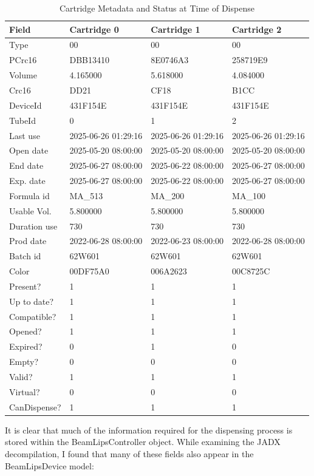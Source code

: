 \begin{table}[H]
\centering
\caption{Cartridge Metadata and Status at Time of Dispense}
\label{tab:cartridgedata}
\begin{scriptsize}
\begin{tabular}{|l|l|l|l|}
\hline
\textbf{Field} & \textbf{Cartridge 0} & \textbf{Cartridge 1} & \textbf{Cartridge 2} \\
\hline
Type & 00 & 00 & 00 \\
PCrc16 & DBB13410 & 8E0746A3 & 258719E9 \\
Volume & 4.165000 & 5.618000 & 4.084000 \\
Crc16 & DD21 & CF18 & B1CC \\
DeviceId & 431F154E & 431F154E & 431F154E \\
TubeId & 0 & 1 & 2 \\
Last use & 2025-06-26 01:29:16 & 2025-06-26 01:29:16 & 2025-06-26 01:29:16 \\
Open date & 2025-05-20 08:00:00 & 2025-05-20 08:00:00 & 2025-05-20 08:00:00 \\
End date & 2025-06-27 08:00:00 & 2025-06-22 08:00:00 & 2025-06-27 08:00:00 \\
Exp. date & 2025-06-27 08:00:00 & 2025-06-22 08:00:00 & 2025-06-27 08:00:00 \\
Formula id & MA\_513 & MA\_200 & MA\_100 \\
Usable Vol. & 5.800000 & 5.800000 & 5.800000 \\
Duration use & 730 & 730 & 730 \\
Prod date & 2022-06-28 08:00:00 & 2022-06-23 08:00:00 & 2022-06-28 08:00:00 \\
Batch id & 62W601 & 62W601 & 62W601 \\
Color & 00DF75A0 & 006A2623 & 00C8725C \\
Present? & 1 & 1 & 1 \\
Up to date? & 1 & 1 & 1 \\
Compatible? & 1 & 1 & 1 \\
Opened? & 1 & 1 & 1 \\
Expired? & 0 & 1 & 0 \\
Empty? & 0 & 0 & 0 \\
Valid? & 1 & 1 & 1 \\
Virtual? & 0 & 0 & 0 \\
CanDispense? & 1 & 1 & 1 \\
\hline
\end{tabular}
\end{scriptsize}
\end{table}
It is clear that much of the information required for the dispensing process is stored within the BeamLipsController object. While examining the JADX decompilation, I found that many of these fields also appear in the BeamLipsDevice model:

